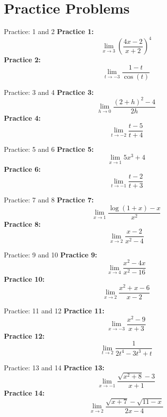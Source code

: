 \documentclass[aspectratio=169]{beamer}
\begin{document}

\section{Practice Problems}

\begin{frame}{Practice: 1 and 2}
\textbf{Practice 1:}
\[
\lim_{x \to 3} \left(\frac{4x-2}{x+2}\right)^4
\]
\vspace{1em}
\textbf{Practice 2:}
\[
\lim_{t \to -3} \frac{1-t}{\cos(t)}
\]
\end{frame}

\begin{frame}{Practice: 3 and 4}
\textbf{Practice 3:}
\[
\lim_{h \to 0} \frac{(2+h)^2-4}{2h}
\]
\vspace{1em}
\textbf{Practice 4:}
\[
\lim_{t \to -2} \frac{t-5}{t+4}
\]
\end{frame}

\begin{frame}{Practice: 5 and 6}
\textbf{Practice 5:}
\[
\lim_{x \to 1} 5x^3 + 4
\]
\vspace{1em}
\textbf{Practice 6:}
\[
\lim_{t \to -1} \frac{t-2}{t+3}
\]
\end{frame}

\begin{frame}{Practice: 7 and 8}
\textbf{Practice 7:}
\[
\lim_{x \to 1} \frac{\log(1+x)-x}{x^2}
\]
\vspace{1em}
\textbf{Practice 8:}
\[
\lim_{x \to 2} \frac{x-2}{x^2-4}
\]
\end{frame}

\begin{frame}{Practice: 9 and 10}
\textbf{Practice 9:}
\[
\lim_{x \to 4} \frac{x^2-4x}{x^2-16}
\]
\vspace{1em}
\textbf{Practice 10:}
\[
\lim_{x \to 2} \frac{x^2+x-6}{x-2}
\]
\end{frame}

\begin{frame}{Practice: 11 and 12}
\textbf{Practice 11:}
\[
\lim_{x \to -3} \frac{x^2-9}{x+3}
\]
\vspace{1em}
\textbf{Practice 12:}
\[
\lim_{t \to 2} \frac{1}{2t^4-3t^3+t}
\]
\end{frame}

\begin{frame}{Practice: 13 and 14}
\textbf{Practice 13:}
\[
\lim_{x \to -1} \frac{\sqrt{x^2+8}-3}{x+1}
\]
\vspace{1em}
\textbf{Practice 14:}
\[
\lim_{x \to 2} \frac{\sqrt{x+7}-\sqrt{11-x}}{2x-4}
\]
\end{frame}
\end{document}
